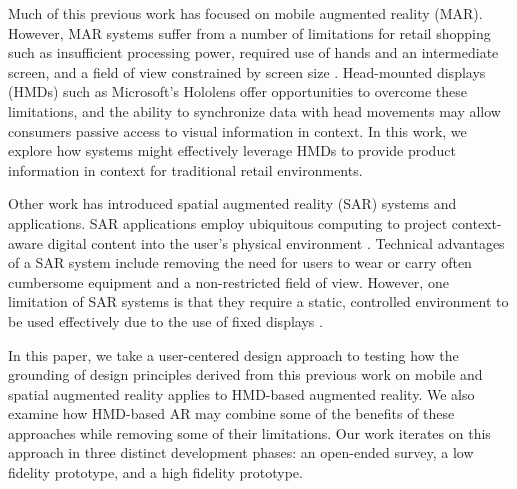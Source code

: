 
Much of this previous work has focused on mobile augmented reality (MAR). However, MAR systems suffer from a number of limitations for retail shopping such as insufficient processing power, required use of hands and an intermediate screen, and a field of view constrained by screen size \cite{bimber2005spatial}. Head-mounted displays (HMDs) such as Microsoft's Hololens offer opportunities to overcome these limitations, and the ability to synchronize data with head movements may allow consumers passive access to visual information in context. In this work, we explore how systems might effectively leverage HMDs to provide product information in context for traditional retail environments. 

Other work has introduced spatial augmented reality (SAR) systems and applications.  SAR applications employ ubiquitous computing to project context-aware digital content into the user's physical environment \cite{benko2015fovear,benko2014dyadic}.  Technical advantages of a SAR system include removing the need for users to wear or carry often cumbersome equipment and a non-restricted field of view.  
However, one limitation of SAR systems is that they require a static, controlled environment to be used effectively due to the use of fixed displays \cite{bimber2005spatial}.

In this paper, we take a user-centered design approach to testing how the grounding of design principles derived from this previous work on mobile and spatial augmented reality applies to HMD-based augmented reality. We also examine how HMD-based AR may combine some of the benefits of these approaches while removing some of their limitations. Our work iterates on this approach in three distinct development phases: an open-ended survey, a low fidelity prototype, and a high fidelity prototype.